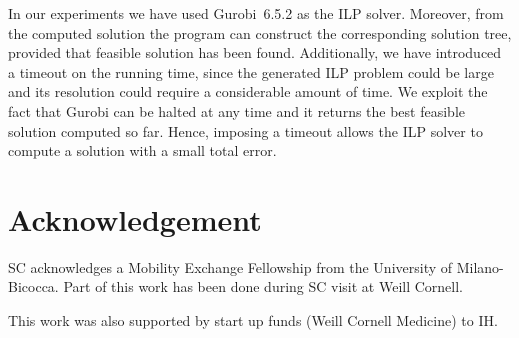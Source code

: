 \documentclass[a4paper,USenglish]{article}
\theoremstyle{definition}
\begin{document}
In our experiments we have used Gurobi~6.5.2 as the ILP solver.
Moreover, from the computed solution the program can construct the
corresponding solution tree, provided that feasible solution has been
found.
Additionally, we have introduced a timeout on the running time, since
the generated ILP problem could be large and its resolution could
require a considerable amount of time.
%
We exploit the fact that Gurobi can be halted at any time and it
returns the best feasible solution computed so far.
%
Hence, imposing a timeout allows the ILP solver to compute a solution
with a small total error.

\section*{Acknowledgement}
SC acknowledges a Mobility Exchange Fellowship from the University of
Milano-Bicocca. Part of this work has been done during SC visit at
Weill Cornell.

This work was also supported by start up funds (Weill Cornell
Medicine) to IH.

% 
%
%
%
% 
%


\end{document}
